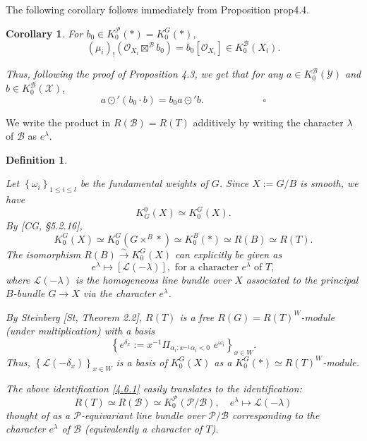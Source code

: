\documentclass{article}
\newtheorem{definition}[theorem]{Definition}
\newtheorem{corollary}[theorem]{Corollary}
\def\L{\mathcal{L}}
\def\P{\mathcal{P}}
\def\X{\mathcal{X}}
\def\B{\mathcal{B}}
\def\Y{\mathcal{Y}}
\def\cite#1{#1}
\def\ref#1{#1}
\begin{document}
The following corollary follows immediately from Proposition \ref{prop4.4}.

\begin{corollary} \label{4.5}
For  $b_0 \in K_0^\P (*) = K_0^G (*)$,
$$
\left(\mu_i\right)_! \left( \mathcal{O}_{X_i} \boxtimes^\B b_0\right) =b_0 \left[\mathcal{O}_{X_i}\right] \in K_0^\B\left(X_i\right).
$$

Thus, following the proof of Proposition \ref{4.3}, we get that for any $a\in K_0^\B\left(\Y \right)$ and $b\in K_0^\B\left(\X\right)$,
$$
a\odot' \left(b_0\cdot b\right) = b_0a\odot' b. \qquad\qquad\qquad \square
$$
\end{corollary} 

We write the product in $R\left(\B\right)=R(T)$ additively by writing the character $\lambda$ of $\B$ as $e^\lambda$. 
\begin{definition}\label{4.6}
\rm{
 Let $\left\{\omega_i\right\}_{1\leq i\leq l}$ be the fundamental weights of $G$. 
Since $X:=G/B$ is smooth, we have 
$$
K_G^0 \left(X\right)\simeq K_0^G \left(X\right). 
$$
By [\cite{CG}, \S5.2.16],
\begin{equation}\label{4.6.1}
K_0^G\left(X\right) \simeq K_0^G \left( G\times^B *\right) \simeq K_0^B(*) \simeq R(B) \simeq R(T).
\end{equation}
The isomorphism $R(B)\xrightarrow{\sim} K_0^G (X)$ can explicitly be given as 
\begin{equation}\label{4.6.2}
e^\lambda \mapsto \left[\L\left(-\lambda\right)\right],\mbox{ for a character $e^\lambda$ of $T$} ,
\end{equation}
 where $\L\left(-\lambda\right)$ is the homogeneous line bundle over $X$ associated to the principal $B$-bundle $G\rightarrow X$ via the character $e^\lambda$. 
 
By Steinberg [\cite{St}, Theorem 2.2], $R(T)$ is a free $R(G)= R(T)^W$-module (under multiplication) with a basis
$$
\left\{ e^{\delta_x} := x^{-1} \Pi_{\alpha_i: x^{-1} \alpha_i <0} \,\,e^{\omega_i}\right\}_{x\in W}.
$$
Thus, $\left\{\L\left(-\delta_x\right)\right\}_{x\in W}$ is a basis of $K_0^G (X)$
as a $K_0^G (*)\simeq R(T) ^W$-module. 

The above identification \eqref{4.6.1}  easily translates to the identification:
$$
R(T)\simeq R\left(\B\right) \simeq K_0^\P \left(\P/\B\right) , \quad e^\lambda \mapsto \L\left(-\lambda\right)
$$
thought of as a $\P$-equivariant line bundle over $\P/\B$
corresponding to the character $e^{\lambda}$ of $\B$ (equivalently a character of $T$). 

}
\end{definition}
\end{document}
